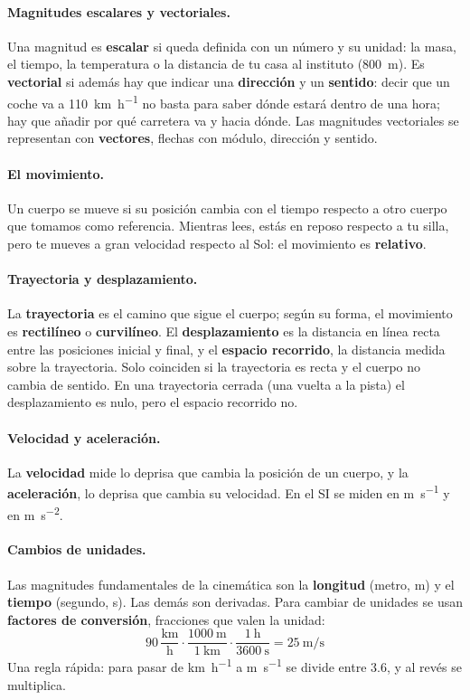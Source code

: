\paragraph{Magnitudes escalares y vectoriales.} Una magnitud es \textbf{escalar} si queda definida con un número y su unidad: la
masa, el tiempo, la temperatura o la distancia de tu casa al instituto (\qty{800}{\m}). Es \textbf{vectorial} si además hay que
indicar una \textbf{dirección} y un \textbf{sentido}: decir que un coche va a \qty{110}{\km\per\hour} no basta para saber dónde
estará dentro de una hora; hay que añadir por qué carretera va y hacia dónde. Las magnitudes vectoriales se representan con
\textbf{vectores}, flechas con módulo, dirección y sentido.

\paragraph{El movimiento.} Un cuerpo se mueve si su posición cambia con el tiempo respecto a otro cuerpo que tomamos como
referencia. Mientras lees, estás en reposo respecto a tu silla, pero te mueves a gran velocidad respecto al Sol: el movimiento es
\textbf{relativo}.

\paragraph{Trayectoria y desplazamiento.} La \textbf{trayectoria} es el camino que sigue el cuerpo; según su forma, el movimiento
es \textbf{rectilíneo} o \textbf{curvilíneo}. El \textbf{desplazamiento} es la distancia en línea recta entre las posiciones
inicial y final, y el \textbf{espacio recorrido}, la distancia medida sobre la trayectoria. Solo coinciden si la trayectoria es
recta y el cuerpo no cambia de sentido. En una trayectoria cerrada (una vuelta a la pista) el desplazamiento es nulo, pero el
espacio recorrido no.

\paragraph{Velocidad y aceleración.} La \textbf{velocidad} mide lo deprisa que cambia la posición de un cuerpo, y la
\textbf{aceleración}, lo deprisa que cambia su velocidad. En el SI se miden en \unit{\m\per\s} y en \unit{\m\per\s\squared}.

\paragraph{Cambios de unidades.} Las magnitudes fundamentales de la cinemática son la \textbf{longitud} (metro, m) y el
\textbf{tiempo} (segundo, s). Las demás son derivadas. Para cambiar de unidades se usan \textbf{factores de conversión}, fracciones
que valen la unidad:
\[ 90\,\frac{\unit{\km}}{\unit{\hour}} \cdot \frac{\qty{1000}{\m}}{\qty{1}{\km}} \cdot \frac{\qty{1}{\hour}}{\qty{3600}{\s}} = \qty{25}{\m\per\s} \]
Una regla rápida: para pasar de \unit{\km\per\hour} a \unit{\m\per\s} se divide entre \num{3.6}, y al revés se multiplica.


